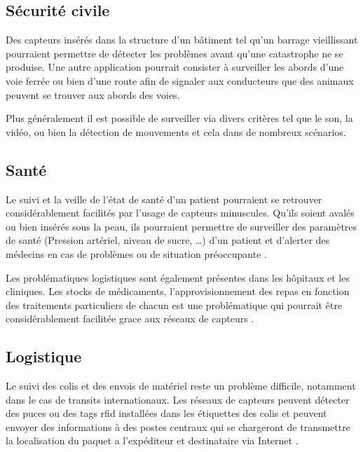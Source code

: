 \subsection{Sécurité civile}

Des capteurs insérés dans la structure d'un bâtiment tel qu'un barrage
vieillissant pourraient permettre de détecter les problèmes avant qu'une
catastrophe ne se produise. Une autre application pourrait consister à
surveiller les abords d'une voie ferrée ou bien d'une route afin de signaler
aux conducteurs que des animaux peuvent se trouver aux abords des voies.

Plus généralement il est possible de surveiller via divers critères tel que le
son, la vidéo, ou bien la détection de mouvements \cite{Chong03sensornetworks}
et cela dans de nombreux scénarios.

\subsection{Santé}

Le suivi et la veille de l'état de santé d'un patient pourraient se retrouver
considérablement facilités par l'usage de capteurs minuscules.  Qu'ils soient
avalés ou bien insérés sous la peau, ils pourraient permettre de surveiller des
paramètres de santé (Pression artériel, niveau de sucre, \ldots) d'un patient
et d'alerter des médecins en cas de problèmes ou de situation préoccupante
\cite{medical-monitoring, medical-monitoring2, medical-monitoring3,
medical-monitoring4}.

Les problématiques logistiques sont également présentes dans les hôpitaux et
les cliniques.  Les stocks de médicaments, l'approvisionnement des repas en
fonction des traitements particuliers de chacun est une problématique qui
pourrait être considérablement facilitée grace aux réseaux de capteurs
\cite{drug-admin}.

\subsection{Logistique}

Le suivi des colis et des envois de matériel reste un problème difficile,
notamment dans le cas de transits internationaux.  Les réseaux de capteurs
peuvent détecter des puces ou des tags rfid installées dans les étiquettes des
colis et peuvent envoyer des informations à des postes centraux qui se
chargeront de transmettre la localisation du paquet a l'expéditeur et
destinataire via Internet \cite{Kahn99nextcentury, A_wirelessintegrated, pico}.

